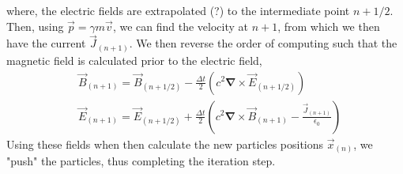 \begin{itemize}
\begin{equation}
\end{equation}
where, the electric fields are extrapolated (?) to the intermediate point $n+1/2$. Then, using $\vec{p}=\gamma m \vec{v}$, we can find the velocity at $n+1$, from which we then have the current $\vec{J}_{(n+1)}$. We then reverse the order of computing such that the magnetic field is calculated prior to the electric field,
\begin{align}
&\vec{B}_{(n+1)}=\vec{B}_{(n+1/2)}-\frac{\Delta t}{2}\left(c^2\mathbf{\nabla}\times \vec{E}_{(n+1/2)}\right)\\
&\vec{E}_{(n+1)}=\vec{E}_{(n+1/2)}+\frac{\Delta t}{2}\left(c^2\mathbf{\nabla}\times \vec{B}_{(n+1)}-\frac{\vec{J}_{(n+1)}}{\epsilon_0}\right)
\end{align}
Using these fields when then calculate the new particles positions $\vec{x}_{(n)}$, we "push" the particles, thus completing the iteration step.







\end{itemize}
